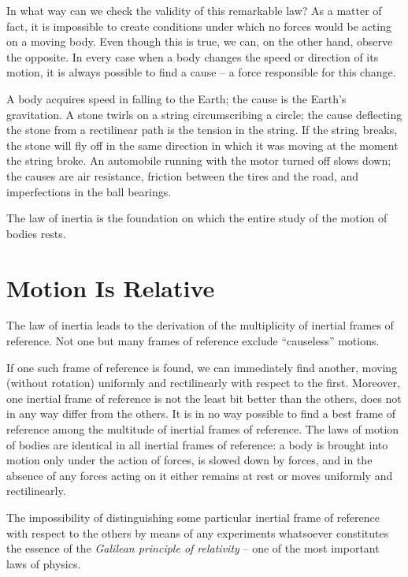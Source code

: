 In what way can we check the validity of this remarkable law? As a matter of fact, it is impossible to create
conditions under which no forces would be acting on a
moving body. Even though this is true, we can, on the
other hand, observe the opposite. In every case when
a body changes the speed or direction of its motion, it
is always possible to find a cause -- a force responsible
for this change.

A body acquires speed in falling to the Earth; the cause
is the Earth's gravitation. A stone twirls on a string
circumscribing a circle; the cause deflecting the stone
from a rectilinear path is the tension in the string. If
the string breaks, the stone will fly off in the same direction in which it was moving at the moment the string
broke. An automobile running with the motor turned off
slows down; the causes are air resistance, friction between
the tires and the road, and imperfections in the ball
bearings.

The law of inertia is the foundation on which the
entire study of the motion of bodies rests.


\section{Motion Is Relative}

The law of inertia leads to the derivation of the multiplicity of inertial frames of reference. Not one but many frames of reference exclude ``causeless'' motions.

If one such frame of reference is found, we can immediately find another, moving (without rotation) uniformly and rectilinearly with respect to the first. Moreover, one inertial frame of reference is not the least bit better than the others, does not in any way differ from the others. It is in no way possible to find a best frame of reference among the multitude of inertial frames of reference. The laws of motion of bodies are identical in all inertial frames of reference: a body is brought into motion only under the action of forces, is slowed down by forces, and in the absence of any forces acting on it either remains at rest or moves uniformly and rectilinearly.

The impossibility of distinguishing some particular inertial frame of reference with respect to the others by means of any experiments whatsoever constitutes the essence of the \emph{Galilean principle of relativity} -- one of the most important laws of physics.

